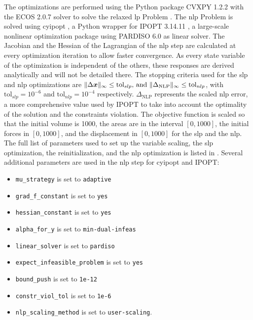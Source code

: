The optimizations are performed using the Python package CVXPY 1.2.2  with the ECOS 2.0.7  solver to solve the relaxed \gls{lp} Problem . The \gls{nlp} Problem  is solved using cyipopt , a Python wrapper for IPOPT 3.14.11 , a large-scale nonlinear optimization package using PARDISO 6.0  as linear solver. The Jacobian and the Hessian of the Lagrangian of the \gls{nlp} step are calculated at every optimization iteration to allow faster convergence. As every state variable of the optimization is independent of the others, these responses are derived analytically and will not be detailed there. The stopping criteria used for the \gls{slp} and \gls{nlp} optimizations are $\lVert\Delta \bm{x}\rVert_\infty \leq \text{tol}_{slp}  \text{, and } \lVert\Delta_{\text{NLP}}\rVert_\infty \leq \text{tol}_{nlp}$, with $\text{tol}_{slp}=10^{-6}$ and $\text{tol}_{nlp}=10^{-4}$ respectively. $\Delta_{\text{NLP}}$ represents the scaled \gls{nlp} error, a more comprehensive value used by IPOPT to take into account the optimality of the solution and the constraints violation. The objective function is scaled so that the initial volume is 1000, the areas are in the interval $[0,1000]$, the initial forces in $[0,1000]$, and the displacement in $[0,1000]$ for the \gls{slp} and the \gls{nlp}. The full list of parameters used to set up the variable scaling, the \gls{slp} optimization, the reinitialization, and the \gls{nlp} optimization is listed in . Several additional parameters are used in the \gls{nlp} step for cyipopt and IPOPT:
\begin{itemize}
    \item \texttt{mu\_strategy} is set to \texttt{adaptive} 
    \item \texttt{grad\_f\_constant} is set to \texttt{yes} 
    \item \texttt{hessian\_constant} is set to \texttt{yes} 
    \item \texttt{alpha\_for\_y} is set to \texttt{min-dual-infeas}
    \item \texttt{linear\_solver} is set to \texttt{pardiso}
    \item \texttt{expect\_infeasible\_problem} is set to \texttt{yes}
    \item \texttt{bound\_push} is set to \texttt{1e-12}
    \item \texttt{constr\_viol\_tol} is set to \texttt{1e-6}
    \item \texttt{nlp\_scaling\_method} is set to \texttt{user-scaling}.
\end{itemize}


